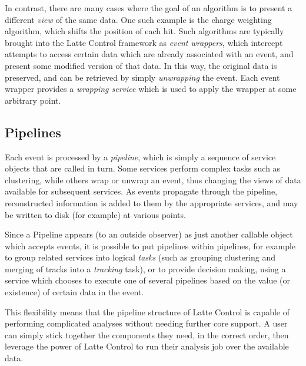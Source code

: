 In contrast, there are many cases where the goal of an algorithm is to present a different \emph{view} of the same data. One such example is the charge weighting algorithm, which shifts the position of each hit. Such algorithms are typically brought into the Latte Control framework as \emph{event wrappers}, which intercept attempts to access certain data which are already associated with an event, and present some modified version of that data. In this way, the original data is preserved, and can be retrieved by simply \emph{unwrapping} the event. Each event wrapper provides a \emph{wrapping service} which is used to apply the wrapper at some arbitrary point.

\subsection{Pipelines}
Each event is processed by a \emph{pipeline}, which is simply a sequence of service objects that are called in turn. Some services perform complex tasks such as clustering, while others wrap or unwrap an event, thus changing the views of data available for subsequent services. As events propagate through the pipeline, reconstructed information is added to them by the appropriate services, and may be written to disk (for example) at various points.

Since a Pipeline appears (to an outside observer) as just another callable object which accepts events, it is possible to put pipelines within pipelines, for example to group related services into logical \emph{tasks} (such as grouping clustering and merging of tracks into a \emph{tracking} task), or to provide decision making, using a service which chooses to execute one of several pipelines based on the value (or existence) of certain data in the event.

This flexibility means that the pipeline structure of Latte Control is capable of performing complicated analyses without needing further core support. A user can simply stick together the components they need, in the correct order, then leverage the power of Latte Control to run their analysis job over the available data.


